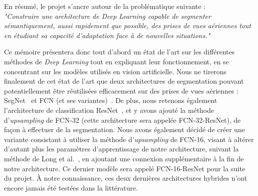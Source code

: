 En résumé, le projet s'ancre autour de la problématique suivante : \\
\textit{"Construire une architecture de \textit{Deep Learning} capable de segmenter sémantiquement, aussi rapidement que possible, des prises de vues aériennes tout en étudiant sa capacité d'adaptation face à de nouvelles situations."}

Ce mémoire présentera donc tout d'abord un état de l'art sur les différentes méthodes de \textit{Deep Learning} tout en expliquant leur fonctionnement, en se concentrant sur les modèles utilisés en vision artificielle. Nous ne tirerons finalement de cet état de l'art que deux architectures de segmentation pouvant potentiellement être réutilisées efficacement sur des prises de vues aériennes : SegNet~\cite{BADR15} et FCN (et ses variantes)~\cite{LONG15}. De plus, nous retenons également l'architecture de classification ResNet~\cite{HE16}, et y avons ajouté la méthode d'\textit{upsampling} de FCN-32 (cette architecture sera appelée FCN-32-ResNet), de façon à effectuer de la segmentation. Nous avons également décidé de créer une variante consistant à utiliser la méthode d'\textit{upsampling} de FCN-16, visant à altérer d'autant plus les paramètres d'apprentissage de notre architecture, suivant la méthode de Long et al.~\cite{LONG15}, en ajoutant une connexion supplémentaire à la fin de notre architecture. Ce dernier modèle sera appelé FCN-16-ResNet pour la suite du projet. À notre connaissance, ces deux dernières architectures hybrides n'ont encore jamais été testées dans la littérature.

